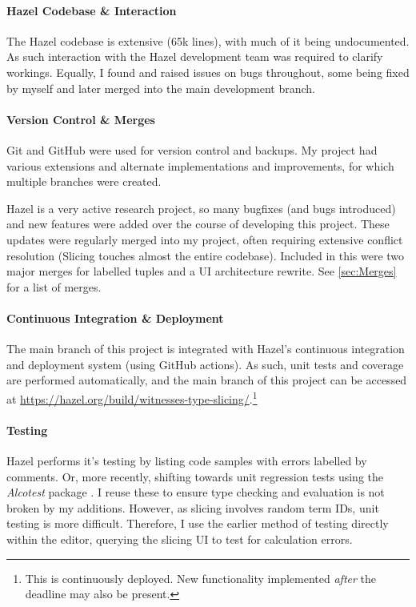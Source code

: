 \paragraph{Hazel Codebase \& Interaction} The Hazel codebase is extensive (65k lines), with much of it being undocumented. As such interaction with the Hazel development team was required to clarify workings. Equally, I found and raised issues on bugs throughout, some being fixed by myself and later merged into the main development branch. 
\paragraph{Version Control \& Merges} Git and GitHub were used for version control and backups. My project had various extensions and alternate implementations and improvements, for which multiple branches were created.

Hazel is a very active research project, so many bugfixes (and bugs introduced) and new features were added over the course of developing this project. These updates were regularly merged into my project, often requiring extensive conflict resolution (Slicing touches almost the entire codebase). Included in this were two major merges for labelled tuples and a UI architecture rewrite. See \cref{sec:Merges} for a list of merges.
\paragraph{Continuous Integration \& Deployment} The main branch of this project is integrated with Hazel's continuous integration and deployment system (using GitHub actions). As such, unit tests and coverage are performed automatically, and the main branch of this project can be accessed at \url{https://hazel.org/build/witnesses-type-slicing/}.\footnote{This is continuously deployed. New functionality implemented \textit{after} the deadline may also be present.}
\paragraph{Testing} Hazel performs it's testing by listing code samples with errors labelled by comments. Or, more recently, shifting towards unit regression tests using the \textit{Alcotest} package \cite{AlcoTest}. I reuse these to ensure type checking and evaluation is not broken by my additions. However, as slicing involves random term IDs, unit testing is more difficult. Therefore, I use the earlier method of testing directly within the editor, querying the slicing UI to test for calculation errors.

